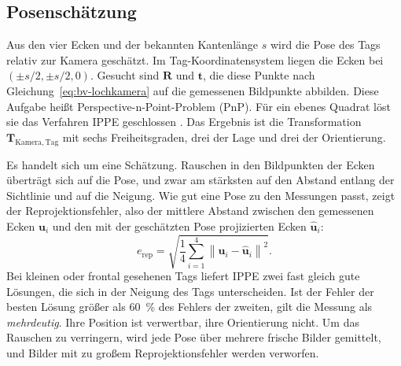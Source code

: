 \subsection{Posenschätzung}
\label{subsec:bv-pose}
Aus den vier Ecken und der bekannten Kantenlänge $s$ wird die Pose des Tags relativ zur Kamera geschätzt. Im Tag-Koordinatensystem liegen die Ecken bei $(\pm s/2, \pm s/2, 0)$. Gesucht sind $\mathbf{R}$ und $\mathbf{t}$, die diese Punkte nach Gleichung~\eqref{eq:bv-lochkamera} auf die gemessenen Bildpunkte abbilden. Diese Aufgabe heißt Perspective-n-Point-Problem (PnP). Für ein ebenes Quadrat löst sie das Verfahren IPPE geschlossen \cite{Collins2014}. Das Ergebnis ist die Transformation $\mathbf{T}_{\mathrm{Kamera,Tag}}$ mit sechs Freiheitsgraden, drei der Lage und drei der Orientierung.

Es handelt sich um eine Schätzung. Rauschen in den Bildpunkten der Ecken überträgt sich auf die Pose, und zwar am stärksten auf den Abstand entlang der Sichtlinie und auf die Neigung. Wie gut eine Pose zu den Messungen passt, zeigt der Reprojektionsfehler, also der mittlere Abstand zwischen den gemessenen Ecken $\mathbf{u}_i$ und den mit der geschätzten Pose projizierten Ecken $\hat{\mathbf{u}}_i$:
\begin{equation}
    e_{\mathrm{rep}} = \sqrt{\frac{1}{4} \sum_{i=1}^{4} \left\lVert \mathbf{u}_i - \hat{\mathbf{u}}_i \right\rVert^2 } .
    \label{eq:bv-reprojektion}
\end{equation}
Bei kleinen oder frontal gesehenen Tags liefert IPPE zwei fast gleich gute Lösungen, die sich in der Neigung des Tags unterscheiden. Ist der Fehler der besten Lösung größer als \SI{60}{\percent} des Fehlers der zweiten, gilt die Messung als \emph{mehrdeutig}. Ihre Position ist verwertbar, ihre Orientierung nicht. Um das Rauschen zu verringern, wird jede Pose über mehrere frische Bilder gemittelt, und Bilder mit zu großem Reprojektionsfehler werden verworfen.

